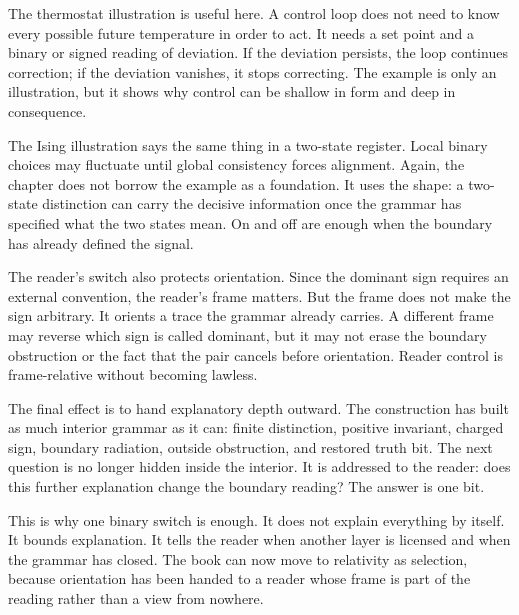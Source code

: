 The thermostat illustration is useful here. A control loop does not need to
know every possible future temperature in order to act. It needs a set point
and a binary or signed reading of deviation. If the deviation persists, the
loop continues correction; if the deviation vanishes, it stops correcting.
The example is only an illustration, but it shows why control can be shallow
in form and deep in consequence.

The Ising illustration says the same thing in a two-state register. Local
binary choices may fluctuate until global consistency forces alignment.
Again, the chapter does not borrow the example as a foundation. It uses the
shape: a two-state distinction can carry the decisive information once the
grammar has specified what the two states mean. On and off are enough when
the boundary has already defined the signal.

The reader's switch also protects orientation. Since the dominant sign
requires an external convention, the reader's frame matters. But the frame
does not make the sign arbitrary. It orients a trace the grammar already
carries. A different frame may reverse which sign is called dominant, but it
may not erase the boundary obstruction or the fact that the pair cancels
before orientation. Reader control is frame-relative without becoming
lawless.

The final effect is to hand explanatory depth outward. The construction has
built as much interior grammar as it can: finite distinction, positive
invariant, charged sign, boundary radiation, outside obstruction, and
restored truth bit. The next question is no longer hidden inside the
interior. It is addressed to the reader: does this further explanation
change the boundary reading? The answer is one bit.

This is why one binary switch is enough. It does not explain everything by
itself. It bounds explanation. It tells the reader when another layer is
licensed and when the grammar has closed. The book can now move to
relativity as selection, because orientation has been handed to a reader
whose frame is part of the reading rather than a view from nowhere.
